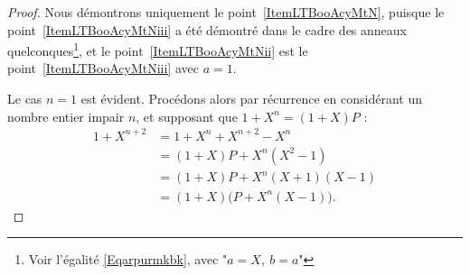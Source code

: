 \begin{proof}
  Nous démontrons uniquement le point~\ref{ItemLTBooAcyMtN}, puisque
  le point~\ref{ItemLTBooAcyMtNiii} a été démontré dans le cadre des anneaux quelconques\footnote{Voir l'égalité
    \eqref{Eqarpurmkbk}, avec "\( a = X,\ b = a\)"}, et le point~\ref{ItemLTBooAcyMtNii} est le point~\ref{ItemLTBooAcyMtNiii} avec \(a = 1\).
    
  Le cas \( n=1\) est évident. Procédons alors par récurrence en considérant un nombre entier impair \( n\), et supposant que \( 1 + X^n = (1+X)P \) :
    \begin{subequations}
        \begin{align}
            1+X^{n+2}&=1+X^n+X^{n+2}-X^n\\
                    &=(1+X)P+X^n(X^2-1)\\
                    &=(1+X)P+X^n(X+1)(X-1)\\
                    &=(1+X)\big( P+X^n(X-1) \big).
        \end{align}
    \end{subequations}
\end{proof}
